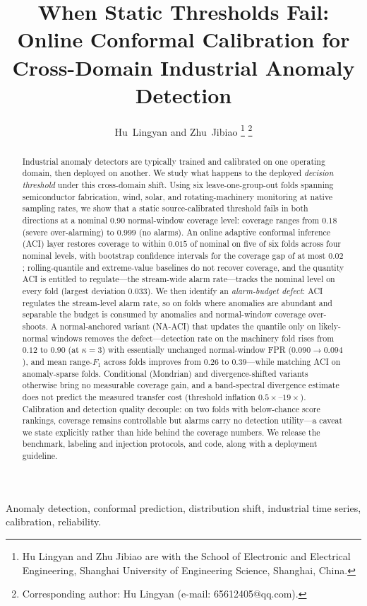 \documentclass[journal]{IEEEtran}
\title{When Static Thresholds Fail: Online Conformal Calibration for\\
Cross-Domain Industrial Anomaly Detection}
\author{Hu~Lingyan and Zhu~Jibiao
\thanks{Hu Lingyan and Zhu Jibiao are with the School of Electronic and Electrical Engineering, Shanghai University of Engineering Science, Shanghai, China.}%
\thanks{Corresponding author: Hu Lingyan (e-mail: 65612405@qq.com).}}
\begin{document}
\maketitle

\begin{abstract}
Industrial anomaly detectors are typically trained and calibrated on one operating domain, then deployed on another. We study what happens to the deployed \emph{decision threshold} under this cross-domain shift. Using six leave-one-group-out folds spanning semiconductor fabrication, wind, solar, and rotating-machinery monitoring at native sampling rates, we show that a static source-calibrated threshold fails in both directions at a nominal 0.90 normal-window coverage level: coverage ranges from $0.18$ (severe over-alarming) to $0.999$ (no alarms). An online adaptive conformal inference (ACI) layer restores coverage to within $0.015$ of nominal on five of six folds across four nominal levels, with bootstrap confidence intervals for the coverage gap of at most $0.02$; rolling-quantile and extreme-value baselines do not recover coverage, and the quantity ACI is entitled to regulate---the stream-wide alarm rate---tracks the nominal level on every fold (largest deviation $0.033$). We then identify an \emph{alarm-budget defect}: ACI regulates the stream-level alarm rate, so on folds where anomalies are abundant and separable the budget is consumed by anomalies and normal-window coverage over-shoots. A normal-anchored variant (NA-ACI) that updates the quantile only on likely-normal windows removes the defect---detection rate on the machinery fold rises from $0.12$ to $0.90$ (at $\kappa{=}3$) with essentially unchanged normal-window FPR ($0.090\!\to\!0.094$), and mean range-$F_1$ across folds improves from $0.26$ to $0.39$---while matching ACI on anomaly-sparse folds. Conditional (Mondrian) and divergence-shifted variants otherwise bring no measurable coverage gain, and a band-spectral divergence estimate does not predict the measured transfer cost (threshold inflation $0.5\times$--$19\times$). Calibration and detection quality decouple: on two folds with below-chance score rankings, coverage remains controllable but alarms carry no detection utility---a caveat we state explicitly rather than hide behind the coverage numbers. We release the benchmark, labeling and injection protocols, and code, along with a deployment guideline.
\end{abstract}

\begin{IEEEkeywords}
Anomaly detection, conformal prediction, distribution shift, industrial time series, calibration, reliability.
\end{IEEEkeywords}











\end{document}
